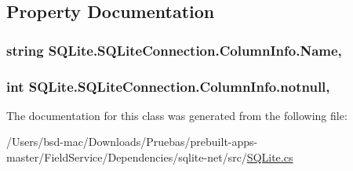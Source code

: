 \subsection{Property Documentation}
\hypertarget{class_s_q_lite_1_1_s_q_lite_connection_1_1_column_info_a6ff7d46bc88a8f3484f7b701732396fe}{
\subsubsection[{Name}]{\setlength{\rightskip}{0pt plus 5cm}string S\+Q\+Lite.\+S\+Q\+Lite\+Connection.\+Column\+Info.\+Name\hspace{0.3cm}{\ttfamily [get]}, {\ttfamily [set]}}}\label{class_s_q_lite_1_1_s_q_lite_connection_1_1_column_info_a6ff7d46bc88a8f3484f7b701732396fe}
\hypertarget{class_s_q_lite_1_1_s_q_lite_connection_1_1_column_info_a598f5773a3b0c9c66f2d9c46c6eb53cd}{
\subsubsection[{notnull}]{\setlength{\rightskip}{0pt plus 5cm}int S\+Q\+Lite.\+S\+Q\+Lite\+Connection.\+Column\+Info.\+notnull\hspace{0.3cm}{\ttfamily [get]}, {\ttfamily [set]}}}\label{class_s_q_lite_1_1_s_q_lite_connection_1_1_column_info_a598f5773a3b0c9c66f2d9c46c6eb53cd}


The documentation for this class was generated from the following file\+:\begin{DoxyCompactItemize}
\item 
/\+Users/bsd-\/mac/\+Downloads/\+Pruebas/prebuilt-\/apps-\/master/\+Field\+Service/\+Dependencies/sqlite-\/net/src/\hyperlink{_s_q_lite_8cs}{S\+Q\+Lite.\+cs}\end{DoxyCompactItemize}
